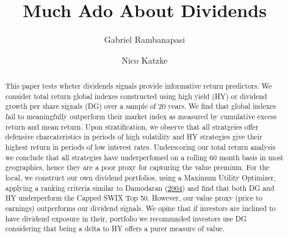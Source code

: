 \documentclass[11pt,preprint, authoryear]{elsarticle}
\numberwithin{equation}{section}
\numberwithin{figure}{section}
\numberwithin{table}{section}
\begin{document}
\begin{frontmatter}  %

\title{Much Ado About Dividends}





\author[Add1]{Gabriel Rambanapasi}

\author[Add2]{Nico Katzke}
\ead{}




\address[Add1]{Stellenbosch University, Cape Town, South Africa}
\address[Add2]{Satrix, Cape Town, South Africa}


\begin{abstract}
\small{
This paper tests wheter dividends signals provide informative return
predictors. We consider total return global indexes constructed using
high yield (HY) or dividend growth per share signals (DG) over a sample
of 20 years. We find that global indexes fail to meaningfully outperform
their market index as measured by cumulative excess return and mean
return. Upon stratification, we observe that all stratgeies offer
defensive charcateristics in periods of high volatility and HY
strategies give their highest return in periods of low interest rates.
Underscoring our total return analysis we conclude that all strategies
have underperfomed on a rolling 60 month basis in most geographies,
hence they are a poor proxy for capturing the value premium. For the
local, we construct our own dividend portfolios, using a Maximum Utility
Optimizer, applying a ranking criteria similar to Damodaran
(\protect\hyperlink{ref-damodaran2004investment}{2004}) and find that
both DG and HY underperform the Capped SWIX Top 50. However, our value
proxy (price to earnings) outperforms our dividend signals. We opine
that if investors are inclined to have dividend exposure in their,
portfolio we recommnded investors use DG considering that being a delta
to HY offers a purer measure of value.
}
\end{abstract}

\vspace{1cm}





\vspace{0.5cm}

\end{frontmatter}
\end{document}
